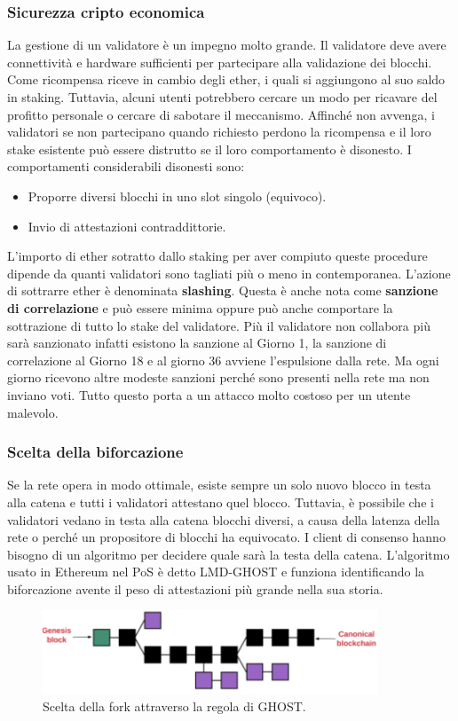 \documentclass[a4paper,11pt]{report}
\begin{document}
\subsubsection{Sicurezza cripto economica}
La gestione di un validatore è un impegno molto grande. Il validatore deve avere connettività e hardware sufficienti per partecipare alla validazione dei blocchi. Come ricompensa  riceve in cambio degli ether, i quali si aggiungono al suo saldo in staking. Tuttavia, alcuni utenti potrebbero cercare un modo per ricavare del profitto personale o cercare di sabotare il meccanismo. Affinché non avvenga, i validatori se non partecipano quando richiesto perdono la ricompensa e il loro stake esistente può essere distrutto se il loro comportamento è disonesto. I comportamenti considerabili disonesti sono: 
\begin{itemize}
\item Proporre diversi blocchi in uno slot singolo (equivoco).
\item Invio di attestazioni contraddittorie. 
\end{itemize}
L'importo di ether sotratto dallo staking per aver compiuto queste procedure dipende da quanti validatori sono tagliati più o meno in contemporanea. L'azione di sottrarre ether è denominata \textbf{slashing}. Questa è anche nota come \textbf{sanzione di correlazione} e può essere minima oppure può anche comportare la sottrazione di tutto lo stake del validatore. Più il validatore non collabora più sarà sanzionato infatti esistono la sanzione al Giorno 1, la sanzione di correlazione al Giorno 18 e al giorno 36 avviene l'espulsione dalla rete. Ma ogni giorno ricevono altre modeste sanzioni perché sono presenti nella rete ma non inviano voti. Tutto questo porta a un attacco molto costoso per un utente malevolo.

\newpage
\subsubsection{Scelta della biforcazione}
Se la rete opera in modo ottimale, esiste sempre un solo nuovo blocco in testa alla catena e tutti i validatori attestano quel blocco. Tuttavia, è possibile che i validatori vedano in testa alla catena blocchi diversi, a causa della latenza della rete o perché un propositore di blocchi ha equivocato. I client di consenso hanno bisogno di un algoritmo per decidere quale sarà la testa della catena. L'algoritmo usato in Ethereum nel PoS è detto LMD-GHOST e funziona identificando la biforcazione avente il peso di attestazioni più grande nella sua storia.
\begin{figure}[htbp] 
\begin{center}
\includegraphics[width=10cm]{img/ghs.png}
\end{center}
\caption{Scelta della fork attraverso la regola di GHOST. \cite{genesis}}
\end{figure}
\end{document}
